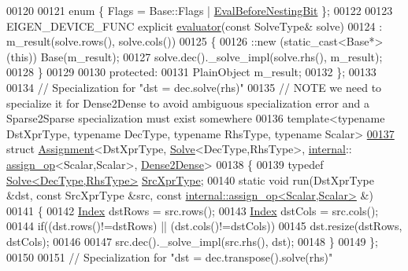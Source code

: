 \begin{DoxyCode}
00120 
00121   \textcolor{keyword}{enum} \{ Flags = Base::Flags | \hyperlink{group__flags_gaa34e83bae46a8eeae4e69ebe3aaecbed}{EvalBeforeNestingBit} \};
00122   
00123   EIGEN\_DEVICE\_FUNC \textcolor{keyword}{explicit} \hyperlink{struct_eigen_1_1internal_1_1evaluator}{evaluator}(\textcolor{keyword}{const} SolveType& solve)
00124     : m\_result(solve.rows(), solve.cols())
00125   \{
00126     ::new (static\_cast<Base*>(\textcolor{keyword}{this})) Base(m\_result);
00127     solve.dec().\_solve\_impl(solve.rhs(), m\_result);
00128   \}
00129   
00130 \textcolor{keyword}{protected}:  
00131   PlainObject m\_result;
00132 \};
00133 
00134 \textcolor{comment}{// Specialization for "dst = dec.solve(rhs)"}
00135 \textcolor{comment}{// NOTE we need to specialize it for Dense2Dense to avoid ambiguous specialization error and a
       Sparse2Sparse specialization must exist somewhere}
00136 \textcolor{keyword}{template}<\textcolor{keyword}{typename} DstXprType, \textcolor{keyword}{typename} DecType, \textcolor{keyword}{typename} RhsType, \textcolor{keyword}{typename} Scalar>
\hyperlink{struct_eigen_1_1internal_1_1_assignment_3_01_dst_xpr_type_00_01_solve_3_01_dec_type_00_01_rhs_ty3ce26f5f592c582be15e9bcd7c0c0744}{00137} \textcolor{keyword}{struct }\hyperlink{struct_eigen_1_1internal_1_1_assignment}{Assignment}<DstXprType, \hyperlink{group___core___module_class_eigen_1_1_solve}{Solve}<DecType,RhsType>, \hyperlink{namespaceinternal}{internal}::
      \hyperlink{struct_eigen_1_1internal_1_1assign__op}{assign\_op}<Scalar,Scalar>, \hyperlink{struct_eigen_1_1internal_1_1_dense2_dense}{Dense2Dense}>
00138 \{
00139   \textcolor{keyword}{typedef} \hyperlink{group___core___module_class_eigen_1_1_solve}{Solve<DecType,RhsType>} \hyperlink{group___core___module_class_eigen_1_1_solve}{SrcXprType};
00140   \textcolor{keyword}{static} \textcolor{keywordtype}{void} run(DstXprType &dst, \textcolor{keyword}{const} SrcXprType &src, \textcolor{keyword}{const} 
      \hyperlink{struct_eigen_1_1internal_1_1assign__op}{internal::assign\_op<Scalar,Scalar>} &)
00141   \{
00142     \hyperlink{namespace_eigen_a62e77e0933482dafde8fe197d9a2cfde}{Index} dstRows = src.rows();
00143     \hyperlink{namespace_eigen_a62e77e0933482dafde8fe197d9a2cfde}{Index} dstCols = src.cols();
00144     \textcolor{keywordflow}{if}((dst.rows()!=dstRows) || (dst.cols()!=dstCols))
00145       dst.resize(dstRows, dstCols);
00146 
00147     src.dec().\_solve\_impl(src.rhs(), dst);
00148   \}
00149 \};
00150 
00151 \textcolor{comment}{// Specialization for "dst = dec.transpose().solve(rhs)"}

\end{DoxyCode}
